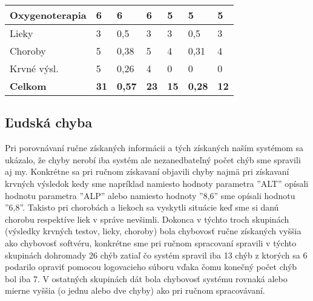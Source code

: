 \begin{table}[h!]
\begin{tabular}{|p{2.3cm}|llp{1.9cm}|llp{1.9cm}|}
		\footnotesize{Oxygenoterapia}   &
		\multicolumn{1}{l|}{6} &
		\multicolumn{1}{l|}{6} &
		6  & 
		\multicolumn{1}{l|}{5} &
		\multicolumn{1}{l|}{5} & 
		5                           
		\\ \hline
		
		\footnotesize{Lieky}   &
		\multicolumn{1}{l|}{3} &
		\multicolumn{1}{l|}{0,5} &
		3  & 
		\multicolumn{1}{l|}{3} &
		\multicolumn{1}{l|}{0,5} & 
		3                          
		\\ \hline
		
		\footnotesize{Choroby}   &
		\multicolumn{1}{l|}{5} &
		\multicolumn{1}{l|}{0,38} &
		5  & 
		\multicolumn{1}{l|}{4} &
		\multicolumn{1}{l|}{0,31} & 
		4                           
		\\ \hline
		
		\footnotesize{Krvné výsl.}   &
		\multicolumn{1}{l|}{5} &
		\multicolumn{1}{l|}{0,26} &
		4  & 
		\multicolumn{1}{l|}{0} &
		\multicolumn{1}{l|}{0} & 
		0                           
		\\ \hline
		
		\footnotesize{\textbf{Celkom}}   &
		\multicolumn{1}{l|}{\textbf{31}} &
		\multicolumn{1}{l|}{\textbf{0,57}} &
		\textbf{23}  & 
		\multicolumn{1}{l|}{\textbf{15}} &
		\multicolumn{1}{l|}{\textbf{0,28}} & 
		\textbf{12}                           
		\\ \hline
	\end{tabular}
\end{table}

\subsection{Ľudská chyba}
\label{ludChyba}

Pri porovnávaní ručne získaných informácii a tých získaných naším systémom sa ukázalo, že chyby nerobí iba systém ale nezanedbateľný počet chýb sme spravili aj my. Konkrétne sa pri ručnom získavaní objavili chyby najmä pri získavaní krvných výsledok kedy sme napríklad namiesto hodnoty parametra ''ALT'' opísali hodnotu parametra ''ALP'' alebo namiesto hodnoty ''8,6'' sme opísali hodnotu ''6,8''. Takisto pri chorobách a liekoch sa vyskytli situácie keď sme si danú chorobu respektíve liek v správe nevšimli. Dokonca v týchto troch skupinách (výsledky krvných testov, lieky, choroby) bola chybovosť ručne získaných vyššia ako chybovosť softvéru, konkrétne sme pri ručnom spracovaní spravili v týchto skupinách dohromady 26 chýb zatiaľ čo systém spravil iba 13 chýb z ktorých sa 6 podarilo opraviť pomocou logovacieho súboru vďaka čomu konečný počet chýb bol iba 7. V ostatných skupinách dát bola chybovosť systému rovnaká alebo mierne vyššia (o jednu alebo dve chyby) ako pri ručnom spracovávaní. 

